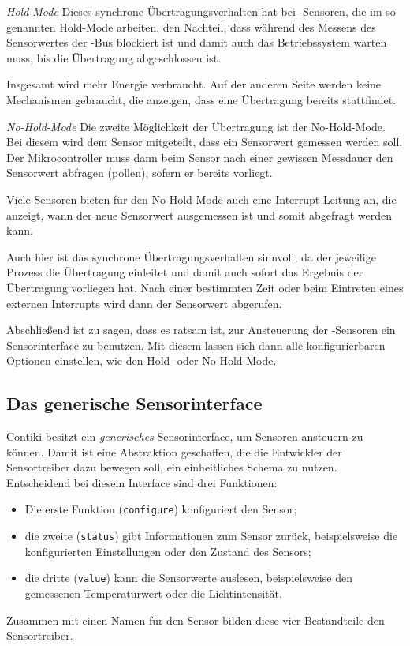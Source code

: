 	\begin{LaTeXdescription}
	\item[\normalfont\itshape Hold-Mode]
		Dieses synchrone Übertragungsverhalten hat bei \ItC-Sensoren,
		die im so genannten Hold-Mode arbeiten, den Nachteil, dass
		während des Messens des Sensorwertes der \ItC-Bus blockiert ist
		und damit auch das Betriebssystem warten muss, bis die
		Übertragung abgeschlossen ist.
		
		Insgesamt wird mehr Energie
		verbraucht. Auf der anderen Seite werden keine Mechanismen
		gebraucht, die anzeigen, dass eine Übertragung bereits
		stattfindet.

	\item[\normalfont\itshape No-Hold-Mode]
		Die zweite Möglichkeit der Übertragung ist der No-Hold-Mode.
		Bei diesem wird dem Sensor mitgeteilt, dass ein Sensorwert
		gemessen werden soll. Der Mikrocontroller muss dann beim Sensor
		nach einer gewissen Messdauer den Sensorwert abfragen (pollen),
		sofern er bereits vorliegt.
		
		Viele Sensoren bieten für den No-Hold-Mode auch eine
		Interrupt-Leitung an, die anzeigt, wann der neue Sensorwert
		ausgemessen ist und somit abgefragt werden kann.

		Auch hier ist das synchrone Übertragungsverhalten sinnvoll, da
		der jeweilige Prozess die Übertragung einleitet und damit auch
		sofort das Ergebnis der Übertragung vorliegen hat.  Nach einer
		bestimmten Zeit oder beim Eintreten eines externen Interrupts
		wird dann der Sensorwert abgerufen.
	\end{LaTeXdescription}

	Abschließend ist zu sagen, dass es ratsam ist,
	zur Ansteuerung der \ItC-Sensoren ein Sensorinterface zu benutzen.
	Mit diesem lassen sich dann alle konfigurierbaren Optionen einstellen,
	wie den Hold- oder No-Hold-Mode.

\subsection{Das generische Sensorinterface}

	Contiki besitzt ein \emph{generisches} Sensorinterface, um Sensoren
	ansteuern zu können. Damit ist eine Abstraktion geschaffen, die
	die Entwickler der Sensortreiber dazu bewegen soll, ein einheitliches
	Schema zu nutzen.
	Entscheidend bei diesem Interface sind drei Funktionen:
	\begin{itemize}
	\item 	Die erste Funktion (\lstinline=configure=)
		konfiguriert den Sensor;
	\item 	die zweite (\lstinline=status=)
		gibt Informationen zum Sensor zurück,
		beispielsweise die konfigurierten Einstellungen
		oder den Zustand des Sensors;
	\item 	die dritte (\lstinline=value=)
		kann die Sensorwerte auslesen,
		beispielsweise den gemessenen Temperaturwert oder die
		Lichtintensität.
	\end{itemize}
	Zusammen mit einen Namen für den Sensor bilden diese vier Bestandteile
	den Sensortreiber.

